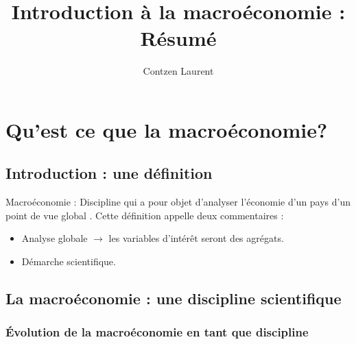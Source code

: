 \documentclass[10pt]{book}
\author{Contzen Laurent}
\title{Introduction à la macroéconomie : Résumé}
\begin{document}
\maketitle
\tableofcontents
\newpage
\chapter{Qu'est ce que la macroéconomie?}
\section{Introduction : une définition}
Macroéconomie : \og Discipline qui a pour objet d'analyser l'économie d'un pays d'un point de vue global \fg. Cette définition appelle deux commentaires :
\begin{itemize}
  \item Analyse globale $\rightarrow$ les variables d'intérêt seront des agrégats.
  \item Démarche scientifique.
\end{itemize}

\section{La macroéconomie : une discipline scientifique}

\subsection{Évolution de la macroéconomie en tant que discipline}
\end{document}
